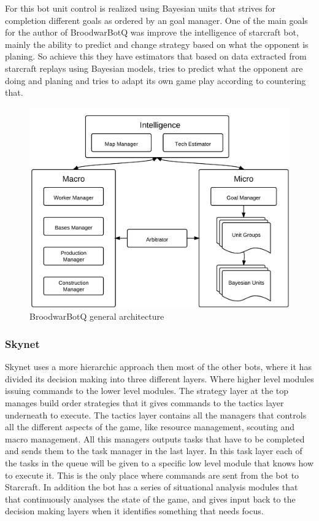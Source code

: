 For this bot unit control is realized using Bayesian units that strives for completion different goals as ordered by an goal manager.\cite{synnaeve2011bayesian} One of the main goals for the author of BroodwarBotQ was improve the intelligence of starcraft bot, mainly the ability to predict and change strategy based on what the opponent is planing. So achieve this they have estimators that based on data extracted from starcraft replays using Bayesian models, tries to predict what the opponent are doing and planing and tries to adapt its own game play according to countering that. 


\begin{figure}[h!tbp]
\centering
\includegraphics[scale=0.8]{graphics/bbq.png}
\caption{BroodwarBotQ general architecture}
\label{fig:bbqarch}
\end{figure}

\subsubsection{Skynet}
Skynet uses a more hierarchic approach then most of the other bots, where it has divided its decision making into three different layers. Where higher level modules issuing commands to the lower level modules. The strategy layer at the top manages build order strategies that it gives commands to the tactics layer underneath to execute. The tactics layer contains all the managers that controls all the different aspects of the game, like resource management, scouting and macro management. All this managers outputs tasks that have to be completed and sends them to the task manager in the last layer. In this task layer each of the tasks in the queue will be given to a specific low level module that knows how to execute it. This is the only place where commands are sent from the bot to Starcraft. In addition the bot has a series of situational analysis modules that that continuously analyses the state of the game, and gives input back to the decision making layers when it identifies something that needs focus.

